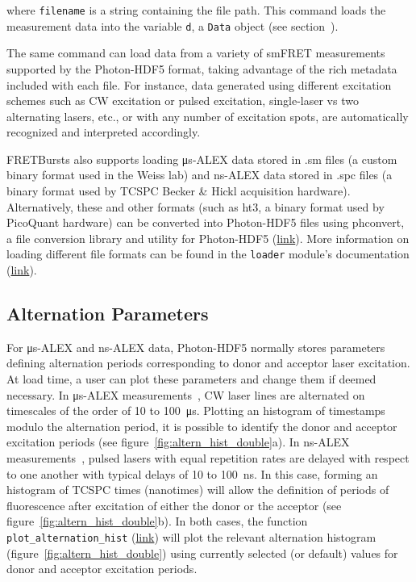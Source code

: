 \documentclass[10pt,letterpaper]{article}
\begin{document}
\noindent
where \verb|filename| is a string containing the file path.
This command loads the measurement data into the variable \verb|d|,
a \verb|Data| object (see section~).

The same command can load data from a variety of smFRET measurements supported
by the Photon-HDF5 format, taking advantage of the rich metadata included with each file.
For instance, data generated using different excitation schemes such as CW excitation
or pulsed excitation, single-laser vs two alternating lasers, etc.,
or with any number of excitation spots, are automatically recognized and interpreted accordingly.

FRETBursts also supports loading μs-ALEX data stored in .sm files
(a custom binary format used in the Weiss lab) and
ns-ALEX data stored in .spc files (a binary format used by TCSPC Becker \& Hickl acquisition hardware).
Alternatively, these and other formats (such as ht3, a binary format used by PicoQuant hardware)
can be converted into Photon-HDF5 files using phconvert,
a file conversion library and utility for Photon-HDF5
(\href{http://photon-hdf5.github.io/phconvert/}{link}).
More information on loading different file formats
can be found in the \verb|loader| module's documentation
(\href{http://fretbursts.readthedocs.org/en/latest/loader.html}{link}).

\subsection*{Alternation Parameters}
\label{sec:alternation}

For μs-ALEX and ns-ALEX data, Photon-HDF5 normally stores parameters defining
alternation periods corresponding to donor and acceptor laser excitation.
At load time, a user can plot these parameters and change them if deemed necessary.
In μs-ALEX measurements~\cite{Kapanidis_2004},
CW laser lines are alternated on timescales of the order of 10 to 100~μs.
Plotting an histogram of timestamps modulo the alternation period, it
is possible to identify the donor and acceptor excitation periods (see figure~\ref{fig:altern_hist_double}a).
In ns-ALEX measurements~\cite{Laurence_2005},
pulsed lasers with equal repetition rates are delayed with respect
to one another with typical delays of 10 to 100~ns.
In this case, forming an histogram of TCSPC times (nanotimes) will allow
the definition of periods of fluorescence after excitation
of either the donor or the acceptor (see figure~\ref{fig:altern_hist_double}b).
In both cases, the function
\verb|plot_alternation_hist|
(\href{http://fretbursts.readthedocs.org/en/latest/plots.html#fretbursts.burst_plot.plot_alternation_hist}{link})
will plot the relevant alternation histogram (figure~\ref{fig:altern_hist_double})
using currently selected (or default) values for donor and acceptor excitation periods.
\end{document}
